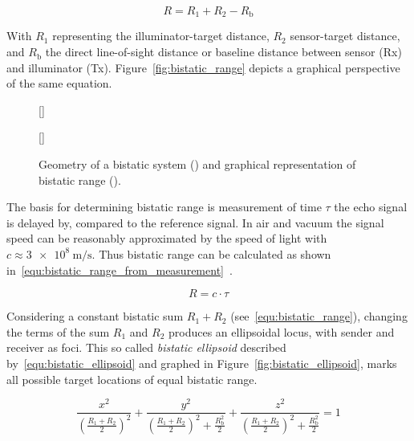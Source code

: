 \begin{equation}\label{equ:bistatic_range}
    R=R_{1}+R_{2}-R_{\text{b}}
\end{equation}

With \(R_{1}\) representing the illuminator-target distance, \(R_{2}\) sensor-target distance, and \(R_{\text{b}}\) the direct line-of-sight distance or baseline distance between sensor (Rx) and illuminator (Tx). Figure~\ref{fig:bistatic_range} depicts a graphical perspective of the same equation.

\begin{figure}[htb]
    \centering
    \subcaptionbox{\label{fig:bistatic_domain}}[\textwidth]{
        \begin{tikzpicture}[x=1cm,y=1cm]
            
        \end{tikzpicture}
    }
    \subcaptionbox{\label{fig:bistatic_range}}[\textwidth]{
        \begin{tikzpicture}[x=1cm,y=1cm]
            
        \end{tikzpicture}
    }
    \caption{Geometry of a bistatic system () and graphical representation of bistatic range ().}\label{fig:bistatic_geometry_and_range}
\end{figure}

The basis for determining bistatic range is measurement of time \(\tau\) the echo signal is delayed by, compared to the reference signal. In air and vacuum the signal speed can be reasonably approximated by the speed of light with \(c\approx\SI[per-mode=symbol]{3e8}{\metre\per\second}\). Thus bistatic range can be calculated as shown in~\ref{equ:bistatic_range_from_measurement}~\cite[p.~11]{Malanowski2019}.

\begin{equation}\label{equ:bistatic_range_from_measurement}
    R=c\cdot\tau
\end{equation}

Considering a constant bistatic sum \(R_{1} + R_{2}\) (see~\ref{equ:bistatic_range}), changing the terms of the sum \(R_{1}\) and \(R_{2}\) produces an ellipsoidal locus, with sender and receiver as foci. This so called \emph{bistatic ellipsoid} described by~\ref{equ:bistatic_ellipsoid} and graphed in Figure~\ref{fig:bistatic_ellipsoid}, marks all possible target locations of equal bistatic range.

\begin{equation}\label{equ:bistatic_ellipsoid}
    \frac{x^2}{{\left(\frac{R_{1}+R_{2}}{2}\right)}^2} + \frac{y^2}{{\left(\frac{R_{1}+R_{2}}{2}\right)}^2 + \frac{R_{\text{b}}^2}{2}} + \frac{z^2}{{\left(\frac{R_{1}+R_{2}}{2}\right)}^2 + \frac{R_{\text{b}}^2}{2}} = 1
\end{equation}

